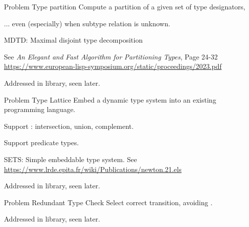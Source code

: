 \begin{frame}{Problem }{Type partition}
  Compute a partition of a given set of type designators,

  \medskip
  
  ... even (especially) when subtype relation is unknown.

  \medskip
  
  MDTD: Maximal disjoint type decomposition

  \medskip
  
  See \emph{An Elegant and Fast Algorithm for Partitioning Types}, Page 24-32 \url{https://www.european-lisp-symposium.org/static/proceedings/2023.pdf}

  \medskip
  
  Addressed in  library, seen later.
\end{frame}

\begin{frame}{Problem }{Type Lattice}
  Embed a dynamic type system into an existing programming language.

  \medskip
  
  Support : intersection, union, complement.

  \medskip
  
  Support predicate types.

  \medskip  

  SETS: Simple embeddable type system.
  See \url{https://www.lrde.epita.fr/wiki/Publications/newton.21.els}

  \medskip
  
  Addressed in  library, seen later.
\end{frame}


\begin{frame}{Problem }{Redundant Type Check}
  Select correct transition, avoiding .

  \medskip

  \scalebox{0.85}{}

  \medskip
  
  Addressed in  library, seen later.
\end{frame}


